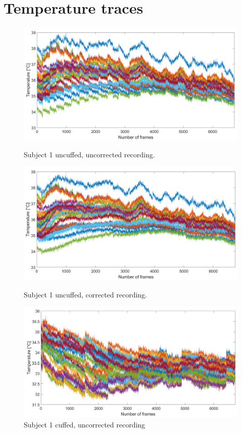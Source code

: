\chapter{Temperature traces}
\label{ch:AppC}
\begin{figure}[htbp]
	\begin{minipage}[b]{0.45\linewidth}
		\centering
		\includegraphics[width=\linewidth]{figures/Recordings/Sub1_uncuffed_uncorr}
		\caption{Subject 1 uncuffed, uncorrected recording.}
	
	\end{minipage}
	\hspace{0.2cm}
	\begin{minipage}[b]{0.45\linewidth}
		\centering
		\includegraphics[width=\linewidth]{figures/Recordings/Sub1_uncuffed_corr}
		\caption{Subject 1 uncuffed, corrected recording.}
	
	\end{minipage}
    \hspace{0.2cm}
	\begin{minipage}[b]{0.45\linewidth}
		\centering
		\includegraphics[width=\linewidth]{figures/Recordings/Sub1_cuffed_uncorr}
		\caption{Subject 1 cuffed, uncorrected recording}
		

\end{minipage}
\end{figure}
